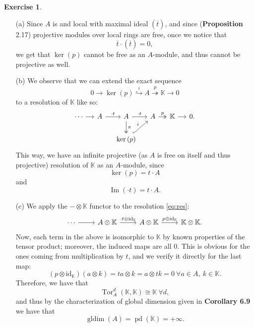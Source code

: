 \documentclass[a4paper]{article}
\newcommand{\K}{\mathbb{K}}
\newcommand{\Tor}{\operatorname{Tor}}
\renewcommand{\Im}{\operatorname{Im}}
\theoremstyle{definition}
\theoremstyle{definition}
\theoremstyle{remark}
\theoremstyle{definition}
\newtheorem{exercise}{Exercise}[section]
\begin{document}
\begin{exercise}
	\begin{itemize}\


		\item[(a)] Since $A$ is and local with maximal ideal $(\overline{t})$, and since (\textbf{Proposition} 2.17) projective modules over local rings are free, once we notice that
	$$ \overline{t}\cdot(\overline{t})=0 ,$$
	we get that $\ker\left( p \right) $ cannot be free as an $A$-module, and thus cannot be projective as well.
		\item[(b)] We observe that we can extend the exact sequence
			$$ 0\rightarrow \ker{(p)}\overset{i}{\hookrightarrow} A\overset{p}{\twoheadrightarrow}\K\rightarrow 0 $$
			to a resolution of $\K$ like so:
			\begin{equation}\label{eq:res}
			\begin{tikzcd}[column sep=small]
				\cdots\rar&A\rar["\cdot t"]&{A} \rar["\cdot t"]\ar[d, "\pi", two heads] & {A} \rar["p", two heads] & {\K} \rar & 0.\\
				&&{\ker{(p)}} \ar[ru, "i", hook]
			\end{tikzcd}
			\end{equation}
			This way, we have an infinite projective (as $A$ is free on itself and thus projective) resolution of $\K$ as an $A$-module, since $$\ker{(p)}=t\cdot A$$ and
			$$\Im{(\cdot t)}=t\cdot A.$$
		\item[(c)] We apply the $-\otimes\K$ functor to the resolution \eqref{eq:res}:
			\begin{equation*}
			\begin{tikzcd}
				\cdots\rar&{A\otimes\K}\rar["\cdot t\otimes\text{id}_{\K}"]&{A\otimes\K} \rar["p\otimes\text{id}_{\K}"] & {\K\otimes\K}.
			\end{tikzcd}
			\end{equation*}
			Now, each term in the above is isomorphic to $\K$ by known properties of the tensor product; moreover, the induced maps are all $0$. This is obvious for the
		ones coming from multiplication by $t$, and we verify it directly for the last map:
		$$ (p\otimes\text{id}_{\K})(a\otimes k)=ta\otimes k=a\otimes tk=0~\forall a\in A,\:k\in\K .$$
		Therefore, we have that $$\Tor^d_A{(\K,\K)}\cong\K~\forall d,$$
		and thus by the characterization of global dimension given in \textbf{Corollary 6.9} we have that $$\operatorname{gldim}(A)=\operatorname{pd}(\K)=+\infty.$$
	\end{itemize}

\end{exercise}
\end{document}
